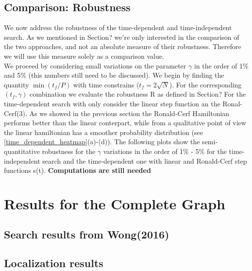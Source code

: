     \subsection{Comparison: Robustness}
    We now address the robustness of the time-dependent and time-independent search. As we mentioned in Section? we're only interested in the comparison of the two approaches, and not an absolute measure of their robustness. Therefore we will use this measure solely as a comparison value. \\
    We proceed by considering small variations on the parameter $\gamma$ in the order of 1\% and 5\% (this numbers still need to be discussed). We begin by finding the quantity $\min(t_f/P)$ with time constrains ($t_f = 2\sqrt{N}$). For the corresponding $(t_f,\gamma)$ combination we evaluate the robustness R as defined in Section?
    For the time-dependent search with only consider the linear step function an the Ronal-Cerf(3). As we showed in the previous section the Ronald-Cerf Hamiltonian performs better than the linear conterpart, while from a qualitative point of view the linear hamiltonian has a smoother probability distribution (see \cref{time_dependent_heatmap}(a)-(d)). The following plots show the semi-quantitative robustness for the $\gamma$ variations in the order of 1\% - 5\% for the time-independent search and the time-dependent one with linear and Ronald-Cerf step functions s(t). \textbf{Computations are still needed}



\section{Results for the Complete Graph}
    \subsection{Search results from Wong(2016)}
    \subsection{Localization results}
